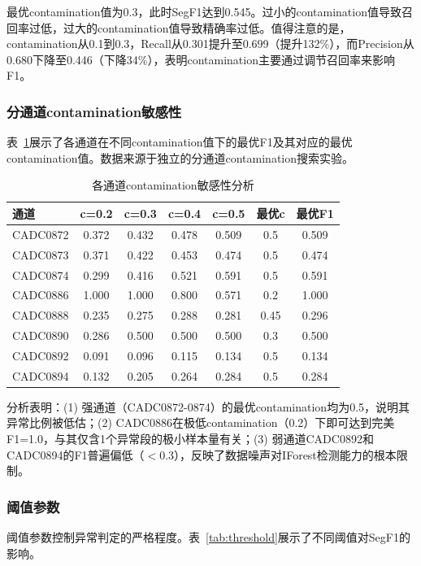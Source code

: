 \documentclass[12pt, a4paper]{article}
\begin{document}
最优contamination值为0.3，此时SegF1达到0.545。过小的contamination值导致召回率过低，过大的contamination值导致精确率过低。值得注意的是，contamination从0.1到0.3，Recall从0.301提升至0.699（提升132\%），而Precision从0.680下降至0.446（下降34\%），表明contamination主要通过调节召回率来影响F1。

\subsubsection{分通道contamination敏感性}

表~\ref{tab:contamination_per_channel}展示了各通道在不同contamination值下的最优F1及其对应的最优contamination值。数据来源于独立的分通道contamination搜索实验。

\begin{table}[H]
\centering
\caption{各通道contamination敏感性分析}
\label{tab:contamination_per_channel}
\begin{tabular}{lcccccc}
\toprule
通道 & c=0.2 & c=0.3 & c=0.4 & c=0.5 & 最优c & 最优F1 \\
\midrule
CADC0872 & 0.372 & 0.432 & 0.478 & 0.509 & 0.5 & 0.509 \\
CADC0873 & 0.371 & 0.422 & 0.453 & 0.474 & 0.5 & 0.474 \\
CADC0874 & 0.299 & 0.416 & 0.521 & 0.591 & 0.5 & 0.591 \\
CADC0886 & 1.000 & 1.000 & 0.800 & 0.571 & 0.2 & 1.000 \\
CADC0888 & 0.235 & 0.275 & 0.288 & 0.281 & 0.45 & 0.296 \\
CADC0890 & 0.286 & 0.500 & 0.500 & 0.500 & 0.3 & 0.500 \\
CADC0892 & 0.091 & 0.096 & 0.115 & 0.134 & 0.5 & 0.134 \\
CADC0894 & 0.132 & 0.205 & 0.264 & 0.284 & 0.5 & 0.284 \\
\bottomrule
\end{tabular}
\end{table}

分析表明：(1) 强通道（CADC0872-0874）的最优contamination均为0.5，说明其异常比例被低估；(2) CADC0886在极低contamination（0.2）下即可达到完美F1=1.0，与其仅含1个异常段的极小样本量有关；(3) 弱通道CADC0892和CADC0894的F1普遍偏低（$<$0.3），反映了数据噪声对IForest检测能力的根本限制。

\subsubsection{阈值参数}

阈值参数控制异常判定的严格程度。表~\ref{tab:threshold}展示了不同阈值对SegF1的影响。
\end{document}
